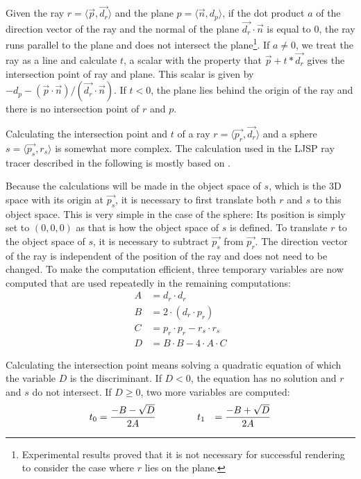 \documentclass[11pt]{report}
\begin{document}
Given the ray $r = \langle \vec{p}, \vec{d_r} \rangle$ and the plane $p = \langle \vec{n}, d_p \rangle$, if the dot product $a$ of the direction vector of the ray and the normal of the plane $\vec{d_r} \cdot \vec{n}$ is equal to $0$, the ray runs parallel to the plane and does not intersect the plane\footnote{Experimental results proved that it is not necessary for successful rendering to consider the case where $r$ lies on the plane.}. If $a \neq 0$, we treat the ray as a line and calculate $t$, a scalar with the property that $\vec{p} + t*\vec{d_r}$ gives the intersection point of ray and plane. This scalar is given by $-d_p-(\vec{p} \cdot \vec{n}) / (\vec{d_r} \cdot \vec{n})$. If $t < 0$, the plane lies behind the origin of the ray and there is no intersection point of $r$ and $p$.

Calculating the intersection point and $t$ of a ray $r = \langle \vec{p_r}, \vec{d_r} \rangle$ and a sphere $s = \langle \vec{p_s}, r_s \rangle$ is somewhat more complex. The calculation used in the LJSP ray tracer described in the following is mostly based on \cite{physrendering}.

Because the calculations will be made in the object space of $s$, which is the 3D space with its origin at $\vec{p_s}$, it is necessary to first translate both $r$ and $s$ to this object space. This is very simple in the case of the sphere: Its position is simply set to $(0,0,0)$ as that is how the object space of $s$ is defined. To translate $r$ to the object space of $s$, it is necessary to subtract $\vec{p_s}$ from $\vec{p_r}$. The direction vector of the ray is independent of the position of the ray and does not need to be changed. To make the computation efficient, three temporary variables are now computed that are used repeatedly in the remaining computations:
\begin{equation*}
\begin{aligned}
A &= d_r \cdot d_r\\
B &= 2 \cdot (d_r \cdot p_r)\\
C &= p_r \cdot p_r - r_s \cdot r_s\\
D &= B \cdot B - 4 \cdot A \cdot C
\end{aligned}
\end{equation*}

Calculating the intersection point means solving a quadratic equation of which the variable $D$ is the discriminant. If $D < 0$, the equation has no solution and $r$ and $s$ do not intersect. If $D \geq 0$, two more variables are computed:
\begin{equation*}
\begin{aligned}
t_0 &= \frac{-B-\sqrt{D}}{2 A}\hspace{1.5cm}
t_1 &= \frac{-B+\sqrt{D}}{2 A}
\end{aligned}
\end{equation*}
\end{document}
